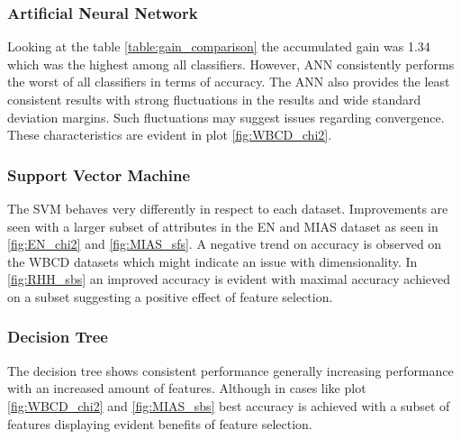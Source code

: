 \begin{table}[hp]
  
  \caption[]%
  {{\small Ranking of which classifiers gained most accuracy when comparing feature selection to full dataset.}}
  \label{table:gain_comparison}
\end{table}

\subsubsection{Artificial Neural Network}

Looking at the table \ref{table:gain_comparison} the accumulated gain was 1.34 which was the highest among all classifiers. However, ANN consistently performs the worst of all classifiers in terms of accuracy. The ANN also provides the least consistent results with strong fluctuations in the results and wide standard deviation margins. Such fluctuations may suggest issues regarding convergence. These characteristics are evident in plot \ref{fig:WBCD_chi2}.



\subsubsection{Support Vector Machine}

The SVM behaves very differently in respect to each dataset. Improvements are seen with a larger subset of attributes in the EN and MIAS dataset as seen in \ref{fig:EN_chi2} and \ref{fig:MIAS_sfs}. A negative trend on accuracy is observed on the WBCD datasets which might indicate an issue with dimensionality. In \ref{fig:RHH_sbs} an improved accuracy is evident with maximal accuracy achieved on a subset suggesting a positive effect of feature selection.



\subsubsection{Decision Tree}

The decision tree shows consistent performance generally increasing performance with an increased amount of features. Although in cases like plot \ref{fig:WBCD_chi2} and \ref{fig:MIAS_sbs} best accuracy is achieved with a subset of features displaying evident benefits of feature selection.



